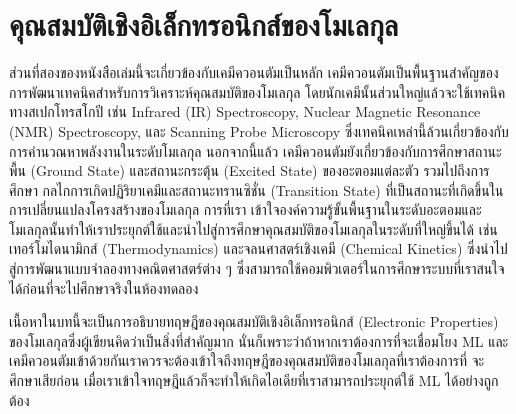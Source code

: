 

\chapter{คุณสมบัติเชิงอิเล็กทรอนิกส์ของโมเลกุล}
\label{ch:el_prop}

ส่วนที่สองของหนังสือเล่มนี้จะเกี่ยวข้องกับเคมีควอนตัมเป็นหลัก เคมีควอนตัมเป็นพื้นฐานสำคัญของการพัฒนาเทคนิคสำหรับการวิเคราะห์คุณสมบัติของโมเลกุล
โดยนักเคมีนั้นส่วนใหญ่แล้วจะใช้เทคนิคทางสเปกโทรสโกปี เช่น Infrared (IR) Spectroscopy, Nuclear Magnetic Resonance (NMR) 
Spectroscopy, และ Scanning Probe Microscopy ซึ่งเทคนิคเหล่านี้ล้วนเกี่ยวข้องกับการคำนวณหาพลังงานในระดับโมเลกุล นอกจากนี้แล้ว%
เคมีควอนตัมยังเกี่ยวข้องกับการศึกษาสถานะพื้น (Ground State) และสถานะกระตุ้น (Excited State) ของอะตอมแต่ละตัว รวมไปถึงการศึกษา%
กลไกการเกิดปฏิริยาเคมีและสถานะทรานซิชั่น (Transition State) ที่เป็นสถานะที่เกิดขึ้นในการเปลี่ยนแปลงโครงสร้างของโมเลกุล การที่เรา%
เข้าใจองค์ความรู้ขั้นพื้นฐานในระดับอะตอมและโมเลกุลนั้นทำให้เราประยุกต์ใช้และนำไปสู่การศึกษาคุณสมบัติของโมเลกุลในระดับที่ใหญ่ขึ้นได้ เช่น 
เทอร์โมไดนามิกส์ (Thermodynamics) และจลนศาสตร์เชิงเคมี (Chemical Kinetics) ซึ่งนำไปสู่การพัฒนาแบบจำลองทางคณิตศาสตร์ต่าง ๆ 
ซึ่งสามารถใช้คอมพิวเตอร์ในการศึกษาระบบที่เราสนใจได้ก่อนที่จะไปศึกษาจริงในห้องทดลอง

เนื้อหาในบทนี้จะเป็นการอธิบายทฤษฎีของคุณสมบัติเชิงอิเล็กทรอนิกส์ (Electronic Properties) ของโมเลกุลซึ่งผู้เขียนคิดว่าเป็นสิ่งที่สำคัญมาก 
นั่นก็เพราะว่าถ้าหากเราต้องการที่จะเชื่อมโยง ML และเคมีควอนตัมเข้าด้วยกันเราควรจะต้องเข้าใจถึงทฤษฎีของคุณสมบัติของโมเลกุลที่เราต้องการที่%
จะศึกษาเสียก่อน เมื่อเราเข้าใจทฤษฎีแล้วก็จะทำให้เกิดไอเดียที่เราสามารถประยุกต์ใช้ ML ได้อย่างถูกต้อง

